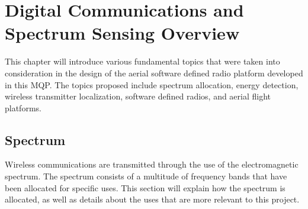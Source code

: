 \chapter{Digital Communications and Spectrum Sensing Overview} \label{Background}
This chapter will introduce various fundamental topics that were taken into consideration in the design of the aerial software defined radio platform developed in this MQP. The topics proposed include spectrum allocation, energy detection, wireless transmitter localization, software defined radios, and aerial flight platforms.

\section{Spectrum}
Wireless communications are transmitted through the use of the electromagnetic spectrum. The spectrum consists of a multitude of frequency bands that have been allocated for specific uses. This section will explain how the spectrum is allocated, as well as details about the uses that are more relevant to this project.

